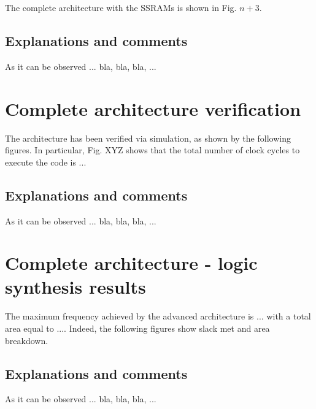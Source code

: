 The complete architecture with the SSRAMs is shown in Fig. $n+3$. 

\subsection{Explanations and comments}

As it can be observed ... bla, bla, bla, ...

\section{Complete architecture verification}

The architecture has been verified via simulation, as shown by the following figures.
In particular, Fig. XYZ shows that the total number of clock cycles to execute the %
code is ...

\subsection{Explanations and comments}

As it can be observed ... bla, bla, bla, ...

\section{Complete architecture - logic synthesis results}

The maximum frequency achieved by the advanced architecture is ... with a total area equal to ....
Indeed, the following figures show slack met and area breakdown.

\subsection{Explanations and comments}

As it can be observed ... bla, bla, bla, ...


